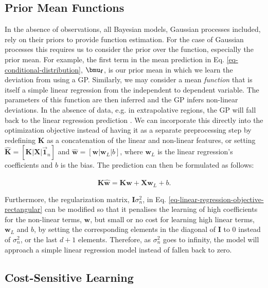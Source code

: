 \documentclass[useAMS,usenatbib,fleqn]{mn2e}
\begin{document}
\subsection{Prior Mean Functions}

In the absence of observations, all Bayesian models, Gaussian processes included, rely on their priors to provide function estimation. For the case of Gaussian processes this requires us to consider the prior over the function, especially the prior mean. For example, the first term in the mean prediction in Eq. \eqref{eq-conditional-distribution}, $\bmu_{\mathbf{f}}$, is our prior mean in which we learn the deviation from using a GP. Similarly, we may consider a mean \emph{function} that is itself a simple linear regression from the independent to dependent variable. The parameters of this function are then inferred and the GP infers non-linear deviations. In the absence of data, e.g. in extrapolative regions, the GP will fall back to the linear regression prediction \citep{roberts2012rs}. We can incorporate this directly into the optimization objective instead of having it as a separate preprocessing step by redefining $\mathbf{K}$ as a concatenation of the linear and non-linear features, or setting $\mathbf{\hat K}=[\mathbf{K}|\mathbf{X}|\vec{\mathbf{1}}_{n}]$ and $\mathbf{\hat w} = \left [\mathbf{w}|\mathbf{w}_{L}|b \right]$, where $\mathbf{w}_{L}$ is the linear regression's coefficients and $b$ is the bias. The prediction can then be formulated as follows:

\begin{equation}
\label{eq-joint-concatenation}
\mathbf{\hat K}\mathbf{\hat w} = \mathbf{K}\mathbf{w}+\mathbf{X}\mathbf{w}_{L}+b.
\end{equation}

Furthermore, the regularization matrix, $\mathbf{I}\sigma_{n}^{2}$, in Eq. \eqref{eq-linear-regression-objective-rectangular} can be modified so that it penalises the learning of high coefficients for the non-linear terms, $\mathbf{w}$, but small or no cost for learning high linear terms, $\mathbf{w}_{L}$ and $b$, by setting the corresponding elements in the diagonal of $\mathbf{I}$ to 0 instead of $\sigma_{n}^{2}$, or the last $d+1$ elements. Therefore, as $\sigma_{n}^{2}$ goes to infinity, the model will approach a simple linear regression model instead of fallen back to zero.

\subsection{Cost-Sensitive Learning}
\end{document}
